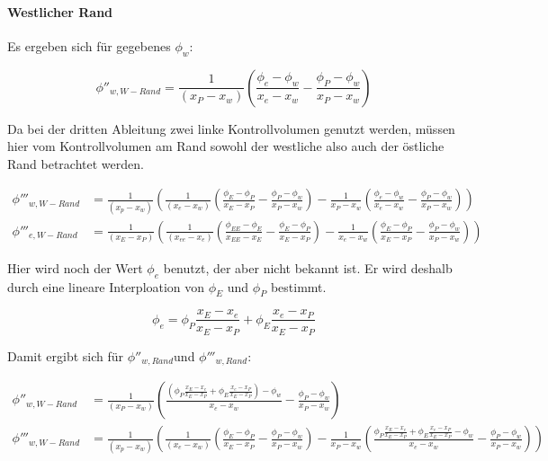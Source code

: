 \documentclass[11pt, ngerman,colorback,accentcolor=tud2d]{tudreport}
\begin{document}
\paragraph{Westlicher Rand}

Es ergeben sich für gegebenes $\phi_w$:


\begin{equation*}
  \phi''_{w, W-Rand} = \frac{1}{(x_P-x_w)}\left({
\frac{\phi_{e}-\phi_w}{x_{e}-x_w}-\frac{\phi_P-\phi_w}{x_P-x_w}}\right)
\end{equation*}

Da bei der dritten Ableitung zwei linke Kontrollvolumen genutzt werden, müssen hier
vom Kontrollvolumen am Rand sowohl der westliche also auch der östliche Rand
betrachtet werden.

\begin{align*}
  \phi'''_{w, W-Rand} &= \frac{1}{(x_p-x_w)} \left({
  \frac{1}{(x_e-x_w)} \left({
    \frac{\phi_E-\phi_P}{x_E-x_P} - \frac{\phi_P-\phi_w}{x_P-x_w}
    }\right) -
  \frac{1}{x_P-x_w} \left({
    \frac{\phi_e-\phi_w}{x_e-x_w} - \frac{\phi_P-\phi_w}{x_P-x_w}
    }\right)
  }\right)
  \\
  \phi'''_{e, W-Rand} &= \frac{1}{(x_E-x_P)} \left({
  \frac{1}{(x_{ee}-x_e)} \left({
      \frac{\phi_{EE}-\phi_E}{x_{EE}-x_E} - \frac{\phi_E-\phi_P}{x_E-x_P}
    }\right) -
  \frac{1}{x_e-x_w} \left({
    \frac{\phi_E-\phi_P}{x_E-x_P} - \frac{\phi_P-\phi_w}{x_P-x_w}
    }\right)
  }\right)
\end{align*}

Hier wird noch der Wert $\phi_e$ benutzt, der aber nicht bekannt ist. Er wird deshalb
durch eine lineare Interploation von $\phi_E$ und $\phi_P$ bestimmt.

\begin{equation}
  \phi_e = \phi_P \frac{x_E-x_e}{x_E-x_P} + \phi_E \frac{x_e-x_P}{x_E-x_P}
\end{equation}

Damit ergibt sich für $\phi''_{w,Rand}$und $\phi'''_{w, Rand}$:

\begin{align}
  \phi''_{w, W-Rand} &= \frac{1}{(x_P-x_w)}\left({
\frac{
  \left({\phi_P \frac{x_E-x_e}{x_E-x_P} + \phi_E \frac{x_e-x_P}{x_E-x_P}
}\right)
-\phi_w}{x_{e}-x_w}-\frac{\phi_P-\phi_w}{x_P-x_w}}\right)\\
  \phi'''_{w, W-Rand} &= \frac{1}{(x_p-x_w)} \left({
  \frac{1}{(x_e-x_w)} \left({
    \frac{\phi_E-\phi_P}{x_E-x_P} - \frac{\phi_P-\phi_w}{x_P-x_w}
    }\right) -
  \frac{1}{x_P-x_w} \left({
    \frac{ \phi_P \frac{x_E-x_e}{x_E-x_P} + \phi_E \frac{x_e-x_P}{x_E-x_P}
-\phi_w}{x_e-x_w} - \frac{\phi_P-\phi_w}{x_P-x_w}
    }\right)
  }\right)
\end{align}
\end{document}
